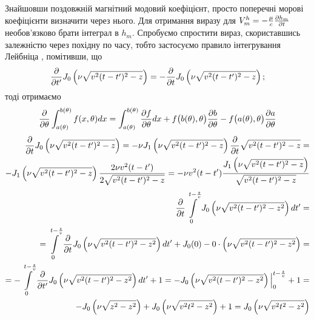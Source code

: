 Знайшовши поздовжній магнітний модовий коефіцієнт, просто поперечні морові 
коефіцієнти визначити через нього. Для отримання виразу для 
$ V_m^h = - \frac{\mu}{c} \frac{\partial h_m}{\partial t} $ необов'язково брати інтеграл в 
$ h_m $. Спробуємо спростити вираз, скориставшись залежністю через похідну по 
часу, тобто застосуємо правило інтегрування Лейбніца \cite{imp:Flanders1973}, 
помітивши, що
%
\begin{equation*} \begin{aligned}
\frac{\partial }{\partial t'} J_0 \left( \nu \sqrt{v^2 (t-t')^2 - z} \right) =
- \frac{\partial }{\partial t} J_0 \left( \nu \sqrt{v^2 (t-t')^2 - z} \right);
\end{aligned} \end{equation*}
%
тоді отримаємо
%
\textcolor{blue} { \begin{equation*} \begin{aligned}
\frac{\partial }{\partial \theta} \int_{a(\theta)}^{b(\theta)} f(x,\theta) dx = 
\int_{a(\theta)}^{b(\theta)} \frac{\partial f}{\partial \theta} dx + 
f\big( b(\theta), \theta \big) \frac{\partial b}{\partial \theta} -
f\big( a(\theta), \theta \big) \frac{\partial a}{\partial \theta}
\end{aligned} \end{equation*} }
%
\textcolor{blue} { \begin{equation*} \begin{aligned}
\frac{\partial }{\partial t} J_0 \left( \nu \sqrt{v^2 (t-t')^2 - z} \right) = 
- \nu J_1 \left( \nu \sqrt{v^2 (t-t')^2 - z} \right) 
\frac{\partial }{\partial t} \sqrt{v^2 (t-t')^2 - z} = \\
-  J_1 \left( \nu \sqrt{v^2 (t-t')^2 - z} \right)
\frac{2 \nu v^2 (t-t')}{2 \sqrt{v^2 (t-t')^2 - z}} = - \nu v^2 (t-t') 
\frac{J_1 \left( \nu \sqrt{v^2 (t-t')^2 - z} \right)}
     {\sqrt{v^2 (t-t')^2 - z}}
\end{aligned} \end{equation*} }
%
\textcolor{blue} { \begin{equation*} \begin{aligned}
\frac{\partial }{\partial t} \int \limits_{0}^{t - \frac{z}{v}} 
J_0 \left( \nu \sqrt{v^2 (t-t')^2 - z^2} \right) dt' = \\
= \int \limits_{0}^{t - \frac{z}{v}} 
\frac{\partial }{\partial t} J_0 \left( \nu \sqrt{v^2 (t-t')^2 - z^2} \right) dt' +
J_0 (0) - 0 \cdot \left( \nu \sqrt{v^2 (t-t')^2 - z^2} \right) = \\
= - \int \limits_{0}^{t - \frac{z}{v}} 
\frac{\partial }{\partial t'} J_0 \left( \nu \sqrt{v^2 (t-t')^2 - z^2} \right) dt' + 1 =
- \Big. J_0 \left( \nu \sqrt{v^2 (t-t')^2 - z^2} \right) \Big|_{0}^{t - \frac{z}{v}} + 1 = \\
- J_0 \left( \nu \sqrt{z^2 - z^2} \right) + J_0 \left( \nu \sqrt{v^2 t^2 - z^2} \right) + 1 = 
J_0 \left( \nu \sqrt{v^2 t^2 - z^2} \right)
\end{aligned} \end{equation*} }
